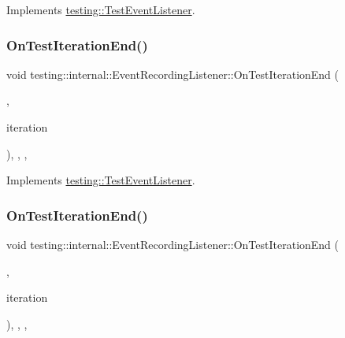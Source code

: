 Implements \mbox{\hyperlink{classtesting_1_1_test_event_listener_a550fdb3e55726e4cefa09f5697941425}{testing\+::\+Test\+Event\+Listener}}.

\mbox{\label{classtesting_1_1internal_1_1_event_recording_listener_a48f6f53c044e8cb6425f9bc7319ddecc}} 
\subsubsection{\texorpdfstring{OnTestIterationEnd()}{OnTestIterationEnd()}\hspace{0.1cm}{\footnotesize\ttfamily [2/3]}}
{\footnotesize\ttfamily void testing\+::internal\+::\+Event\+Recording\+Listener\+::\+On\+Test\+Iteration\+End (\begin{DoxyParamCaption}\item[{const \mbox{\hyperlink{classtesting_1_1_unit_test}{Unit\+Test}} \&}]{,  }\item[{int}]{iteration }\end{DoxyParamCaption})\hspace{0.3cm}{\ttfamily [inline]}, {\ttfamily [override]}, {\ttfamily [protected]}, {\ttfamily [virtual]}}



Implements \mbox{\hyperlink{classtesting_1_1_test_event_listener_a550fdb3e55726e4cefa09f5697941425}{testing\+::\+Test\+Event\+Listener}}.

\mbox{\label{classtesting_1_1internal_1_1_event_recording_listener_a48f6f53c044e8cb6425f9bc7319ddecc}} 
\subsubsection{\texorpdfstring{OnTestIterationEnd()}{OnTestIterationEnd()}\hspace{0.1cm}{\footnotesize\ttfamily [3/3]}}
{\footnotesize\ttfamily void testing\+::internal\+::\+Event\+Recording\+Listener\+::\+On\+Test\+Iteration\+End (\begin{DoxyParamCaption}\item[{const \mbox{\hyperlink{classtesting_1_1_unit_test}{Unit\+Test}} \&}]{,  }\item[{int}]{iteration }\end{DoxyParamCaption})\hspace{0.3cm}{\ttfamily [inline]}, {\ttfamily [override]}, {\ttfamily [protected]}, {\ttfamily [virtual]}}



